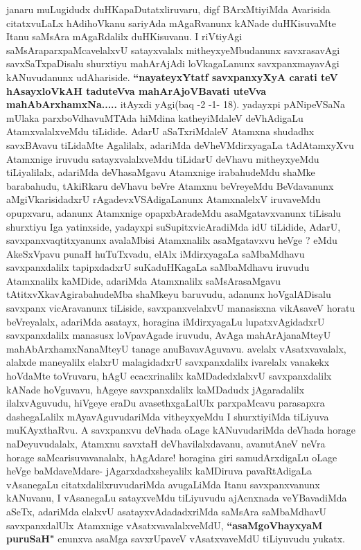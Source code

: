 \begin{artha}
janaru muLugidudx duHKapaDutatxliruvaru, digf BArxMtiyiMda Avarisida
citatxvuLaLx hAdihoVkanu sariyAda mAgaRvanunx kANade
duHKisuvaMte Itanu saMsAra mAgaRdalilx duHKisuvanu. I riVtiyAgi
saMsAraparxpaMcavelalxvU satayxvalalx mitheyxyeMbudanunx savxrasavAgi
savxSaTxpaDisalu shurxtiyu mahArAjAdi loVkagaLanunx savxpanxmayavAgi
kANuvudanunx udAhariside. \textbf{``nayateyxYtatf savxpanxyXyA carati teV
hAsayxloVkAH taduteVva mahArAjoVBavati uteVva
mahAbArxhamxNa.....} itAyxdi yAgi(baq -2 -1- 18). yadayxpi pANipeVSaNa
mUlaka parxboVdhavuMTAda hiMdina katheyiMdaleV deVhAdigaLu
AtamxvalalxveMdu tiLidide. AdarU aSaTxriMdaleV Atamxna shudadhx
savxBAvavu tiLidaMte Agalilalx, adariMda deVheVMdirxyagaLa tAdAtamxyXvu
Atamxnige iruvudu satayxvalalxveMdu tiLidarU deVhavu mitheyxyeMdu
tiLiyalilalx, adariMda deVhasaMgavu Atamxnige irabahudeMdu shaMke
barabahudu, tAkiRkaru deVhavu beVre Atamxnu beVreyeMdu BeVdavanunx
aMgiVkarisidadxrU rAgadevxVSAdigaLanunx AtamxnalelxV iruvaveMdu
opupxvaru, adanunx Atamxnige opapxbAradeMdu asaMgatavxvanunx tiLisalu
shurxtiyu Iga yatinxside, yadayxpi suSupitxvicAradiMda idU tiLidide,
AdarU, savxpanxvaqtitxyanunx avalaMbisi Atamxnalilx asaMgatavxvu heVge
? eMdu AkeSxVpavu punaH huTuTxvadu, elAlx iMdirxyagaLa saMbaMdhavu
savxpanxdalilx tapipxdadxrU suKaduHKagaLa saMbaMdhavu iruvudu
Atamxnalilx kaMDide, adariMda Atamxnalilx saMsArasaMgavu
tAtitxvXkavAgirabahudeMba shaMkeyu baruvudu, adanunx hoVgalADisalu
savxpanx vicAravanunx tiLiside, savxpanxvelalxvU manasisxna vikAsaveV
horatu beVreyalalx, adariMda asatayx, horagina iMdirxyagaLu
lupatxvAgidadxrU savxpanxdalilx manasusx loVpavAgade iruvudu, AvAga
mahArAjanaMteyU mahAbArxhamxNanaMteyU tanage anuBavavAguvavu. avelalx
vAsatxvavalalx, alalxde maneyalilx elalxrU malagidadxrU
savxpanxdalilx ivarelalx vanakekx hoVdaMte toVruvaru, hAgU
ecacxrinalilx kaMDadedxlalxvU savxpanxdalilx kANade hoVguvavu, hAgeye
savxpanxdalilx kaMDadudx jAgaradalilx ilalxvAguvudu, hiVgeye eraDu
avasethxgaLalUlx parxpaMcavu parasapxra dashegaLalilx
mAyavAguvudariMda vitheyxyeMdu I shurxtiyiMda tiLiyuva muKAyxthaRvu.
A savxpanxvu deVhada oLage kANuvudariMda deVhada horage
naDeyuvudalalx, Atamxnu savxtaH deVhavilalxdavanu, avanutAneV neVra
horage saMcarisuvavanalalx, hAgAdare! horagina giri samudArxdigaLu
oLage heVge baMda\-veMdare- jAgarxdadxsheyalilx kaMDiruva
pavaRtAdigaLa vAsanegaLu citatxdalilxruvudariMda avugaLiMda Itanu
savxpanxvanunx kANuvanu, I vAsanegaLu satayxveMdu tiLiyuvudu
ajAcnxnada veYBavadiMda aSeTx, adariMda elalxvU asatayxvAdadadxriMda
saMsAra saMbaMdhavU savxpanxdalUlx Atamxnige vAsatxvavalalxveMdU,
 \textbf{``asaMgoVhayxyaM puruSaH"} enunxva asaMga savxrUpaveV vAsatxvaveMdU
tiLiyuvudu yukatx.
\end{artha}

